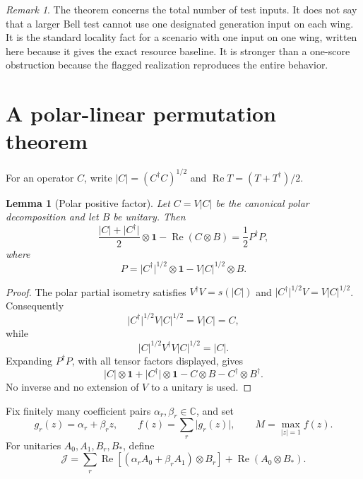\documentclass[11pt]{article}
\newtheorem{lemma}[theorem]{Lemma}
\theoremstyle{remark}
\newtheorem{remark}[theorem]{Remark}
\newcommand{\Id}{\mathbf 1}
\newcommand{\cJ}{\mathcal J}
\newcommand{\bbC}{\mathbb C}
\newcommand{\Reop}{\operatorname{Re}}
\newcommand{\absop}[1]{\lvert #1\rvert}
\begin{document}
\begin{remark}
The theorem concerns the total number of test inputs.  It does not say that a
larger Bell test cannot use one designated generation input on each wing.
It is the standard locality fact for a scenario with one input on one wing,
written here because it gives the exact resource baseline.  It is stronger
than a one-score obstruction because the flagged realization reproduces the
entire behavior.
\end{remark}

\section{A polar-linear permutation theorem}

For an operator \(C\), write
\(\absop C=(C^\dagger C)^{1/2}\) and
\(\Reop T=(T+T^\dagger)/2\).

\begin{lemma}[Polar positive factor]\label{lem:polar}
Let \(C=V\absop C\) be the canonical polar decomposition and let \(B\) be
unitary.  Then
\[
\frac{\absop C+\absop{C^\dagger}}2\otimes\Id
-\Reop(C\otimes B)
=\frac12P^\dagger P,
\]
where
\[
P=
\absop{C^\dagger}^{1/2}\otimes\Id
-V\absop C^{1/2}\otimes B.
\]
\end{lemma}

\begin{proof}
The polar partial isometry satisfies
\(V^\dagger V=s(\absop C)\) and
\(\absop{C^\dagger}^{1/2}V=V\absop C^{1/2}\).  Consequently
\[
\absop{C^\dagger}^{1/2}V\absop C^{1/2}=V\absop C=C,
\]
while
\[
\absop C^{1/2}V^\dagger V\absop C^{1/2}=\absop C.
\]
Expanding \(P^\dagger P\), with all tensor factors displayed, gives
\[
\absop C\otimes\Id+\absop{C^\dagger}\otimes\Id
-C\otimes B-C^\dagger\otimes B^\dagger.
\]
No inverse and no extension of \(V\) to a unitary is used.
\end{proof}

Fix finitely many coefficient pairs
\(\alpha_r,\beta_r\in\bbC\), and set
\[
g_r(z)=\alpha_r+\beta_rz,\qquad
f(z)=\sum_r\absop{g_r(z)},\qquad
M=\max_{|z|=1}f(z).
\]
For unitaries \(A_0,A_1,B_r,B_*\), define
\begin{equation}
\cJ
=
\sum_r\Reop\!\left[
(\alpha_rA_0+\beta_rA_1)\otimes B_r
\right]
+\Reop(A_0\otimes B_*).
\label{eq:polar-linear}
\end{equation}
\end{document}
